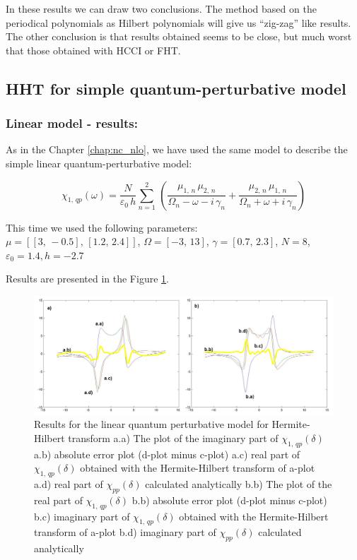 \documentclass[12pt,twoside,a4paper]{article}
\numberwithin{equation}{subsection}
\numberwithin{figure}{subsection}
\begin{document}
In these results we can draw two conclusions. The method based on the periodical polynomials as Hilbert polynomials will
give us ``zig-zag'' like results. The other conclusion is that results obtained seems to be close, but much worst that those
obtained with HCCI or FHT. 

\subsection{HHT for simple quantum-perturbative model} \label{chap:hermite_quantum}

\subsubsection*{Linear model - results:}

As in the Chapter \ref{chap:nc_nlo}, we have used the same model to describe the simple linear quantum-perturbative model: 

\begin{equation} \label{eq:hht_qp}
  {\chi_{1, \,qp}}(\omega ) = \frac {N}{\varepsilon_0\,h} \sum_{n=1}^{2}\,(\frac {{\mu_{1, \,n}}\,{ \mu_{2, \,n}}}{{\Omega_{n}}
  - \omega  - i\,{\gamma_{n}}} + \frac {{\mu_{2, \,n}}\,{\mu_{1, \,n}}}{{\Omega_{n}} + \omega + i\,{\gamma_{n}}})
\end{equation}

This time we used the following parameters: \\
$\mu = [[3, \, - 0.5], \,[1.2, \,2.4]]$, 
$\Omega =[ - 3, \,13]$, 
$\gamma =[0.7, \,2.3]$,  
$N=8$, 
${\varepsilon_{0}}=1.4, 
h= - 2.7$

Results are presented in the Figure \ref{fig:hht_qp1}. 

\begin{figure}
  \includegraphics[width=150mm]{img/hht_qp1.png}
  \caption{Results for the linear quantum perturbative model for Hermite-Hilbert transform
    a.a) The plot of the imaginary part of ${\chi_{1, \,qp}}(\delta )$
    a.b) absolute error plot (d-plot minus c-plot) 
    a.c) real part of ${\chi_{1, \,qp}}(\delta )$ obtained with the Hermite-Hilbert transform of a-plot 
    a.d) real part of ${\chi_{pp}}(\delta )$ calculated analytically 
    b.b) The plot of the real part of ${\chi_{1, \,qp}}(\delta )$ 
    b.b) absolute error plot (d-plot minus c-plot) 
    b.c) imaginary part of ${\chi_{1, \,qp}}(\delta )$ obtained with the Hermite-Hilbert transform of a-plot 
    b.d) imaginary part of ${\chi_{pp}}(\delta )$ calculated analytically  
    \label{fig:hht_qp1}
  }
\end{figure}
\end{document}
